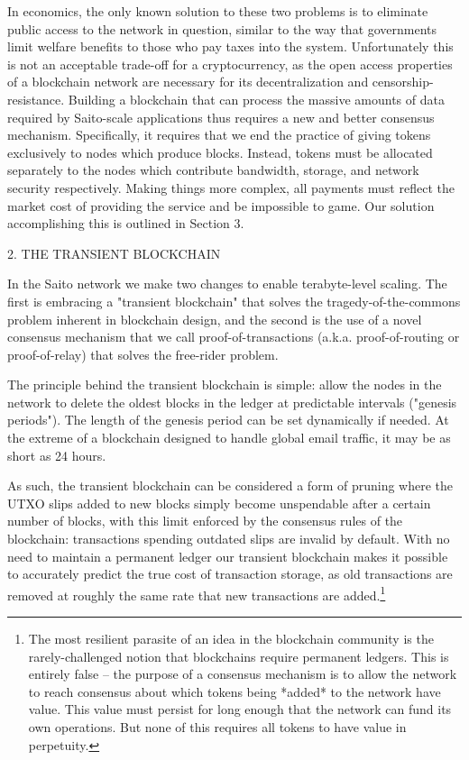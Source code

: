\documentclass[11.5pt, oneside]{article}   	%
\begin{document}
\begin{multicols}{2}
In economics, the only known solution to these two problems is to eliminate public access to the network in question, similar to the way that governments limit welfare benefits to those who pay taxes into the system. Unfortunately this is not an acceptable trade-off for a cryptocurrency, as the open access properties of a blockchain network are necessary for its decentralization and censorship-resistance. Building a blockchain that can process the massive amounts of data required by Saito-scale applications thus requires a new and better consensus mechanism. Specifically, it requires that we end the practice of giving tokens exclusively to nodes which produce blocks. Instead, tokens must be allocated separately to the nodes which contribute bandwidth, storage, and network security respectively. Making things more complex, all payments must reflect the market cost of providing the service and be impossible to game. Our solution accomplishing this is outlined in Section 3.

2. THE TRANSIENT BLOCKCHAIN

In the Saito network we make two changes to enable terabyte-level scaling. The first is embracing a "transient blockchain" that solves the tragedy-of-the-commons problem inherent in blockchain design, and the second is the use of a novel consensus mechanism that we call proof-of-transactions (a.k.a. proof-of-routing or proof-of-relay) that solves the free-rider problem. 

The principle behind the transient blockchain is simple: allow the nodes in the network to delete the oldest blocks in the ledger at predictable intervals ("genesis periods"). The length of the genesis period can be set dynamically if needed. At the extreme of a blockchain designed to handle global email traffic, it may be as short as 24 hours.

As such, the transient blockchain can be considered a form of pruning where the UTXO slips added to new blocks simply become unspendable after a certain number of blocks, with this limit enforced by the consensus rules of the blockchain: transactions spending outdated slips are invalid by default. With no need to maintain a permanent ledger our transient blockchain makes it possible to accurately predict the true cost of transaction storage, as old transactions are removed at roughly the same rate that new transactions are added.\footnote[1]{The most resilient parasite of an idea in the blockchain community is the rarely-challenged notion that blockchains require permanent ledgers. This is entirely false -- the purpose of a consensus mechanism is to allow the network to reach consensus about which tokens being *added* to the network have value. This value must persist for long enough that the network can fund its own operations. But none of this requires all tokens to have value in perpetuity.}


\end{multicols}
\end{document}
